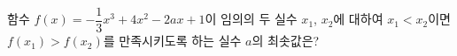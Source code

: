 함수 $f(x)=-\dfrac{1}{3}x^3+4x^2-2ax+1$이 임의의 두 실수 $x_1$, $x_2$에 대하여 $x_1<x_2$이면 $f(x_1)>f(x_2)$를 만족시키도록 하는 실수 $a$의 최솟값은?
